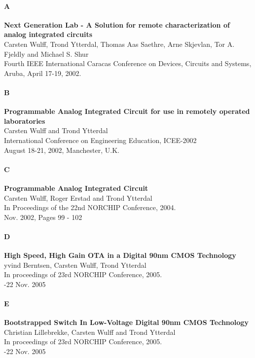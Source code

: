 \paragraph{A }\textbf{Next Generation Lab - A Solution for remote
  characterization of analog integrated circuits}\\
\indent Carsten Wulff, Trond Ytterdal, Thomas Aas Saethre, Arne Skjevlan,
Tor A. Fjeldly and Michael S. Shur\\
\indent Fourth IEEE International Caracas Conference on Devices, Circuits and
Systems, Aruba, April 17-19, 2002.\\


\paragraph{B}\textbf{Programmable Analog Integrated Circuit for use in remotely
  operated laboratories}\\
\indent Carsten Wulff and Trond Ytterdal\\
\indent International Conference on Engineering Education, ICEE-2002\\
\indent August 18-21, 2002, Manchester, U.K.\\
\paragraph{C}\textbf{Programmable Analog Integrated Circuit}\\
\indent Carsten Wulff, Roger Erstad and Trond Ytterdal\\
\indent In Proceedings of the 22nd NORCHIP Conference, 2004.\\
\indent Nov. 2002, Pages 99 - 102\\

\paragraph{D}\textbf{High Speed, High Gain OTA in a Digital 90nm CMOS
  Technology}\\
\indent {\O}yvind Berntsen, Carsten Wulff, Trond Ytterdal\\
\indent In proceedings of 23rd NORCHIP Conference, 2005.\\
-22 Nov. 2005 

\paragraph{E}\textbf{Bootstrapped Switch In Low-Voltage Digital 90nm CMOS
  Technology}\\
\indent Christian Lillebrekke, Carsten Wulff and Trond Ytterdal\\
\indent In proceedings of 23rd NORCHIP Conference, 2005.\\
-22 Nov. 2005 

